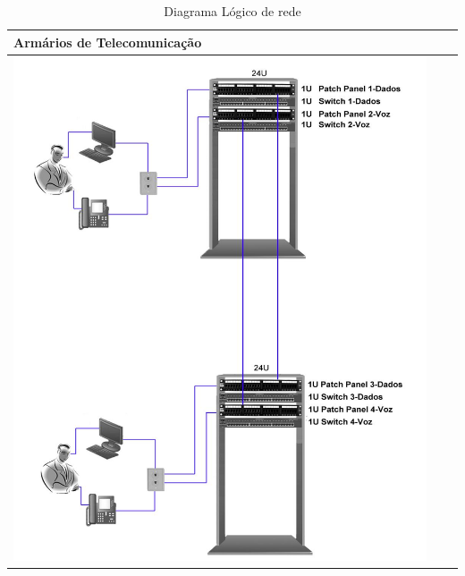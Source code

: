 \begin{table}[h!]
\centering
\caption{Diagrama Lógico de rede}
\label{tab1}
\begin{tabular}{|l|l|l|}
\hline
\multicolumn{1}{|l|}{Armários de Telecomunicação} \\ \hline
\includegraphics[scale=0.2]{fig1}        \\ \hline

\end{tabular}
\end{table}